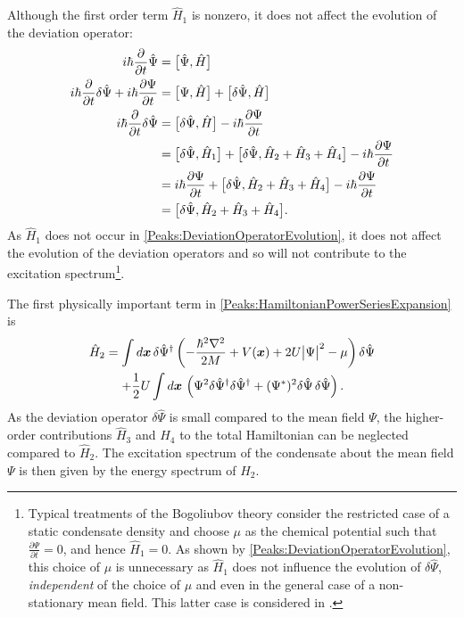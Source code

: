 Although the first order term $\hat{H}_1$ is nonzero, it does not affect the evolution of the deviation operator:
\begin{align}
    i \hbar \frac{\partial }{\partial t}\hat{\Psi} &= \comm{\hat{\Psi}, \hat{H}}\\
    i \hbar \frac{\partial }{\partial t}\delta{\hat{\Psi}} + i \hbar \frac{\partial \Psi}{\partial t} &= \comm{\Psi, \hat{H}} + \comm{\delta\hat{\Psi}, \hat{H}}\\
    i \hbar \frac{\partial }{\partial t}\delta \hat{\Psi} &= \comm{\delta \hat{\Psi}, \hat{H}} - i \hbar \frac{\partial  \Psi}{\partial t}\\
    &= \comm{\delta \hat{\Psi}, \hat{H}_1} + \comm{\delta \hat{\Psi}, \hat{H}_2 + \hat{H}_3 + \hat{H}_4} - i \hbar \frac{\partial\Psi }{\partial t}\\
    &= i \hbar \frac{\partial \Psi}{\partial t} + \comm{\delta \hat{\Psi}, \hat{H}_2 + \hat{H}_3 + \hat{H}_4} - i \hbar \frac{\partial \Psi}{\partial t}\\
    &= \comm{\delta \hat{\Psi}, \hat{H}_2 + \hat{H}_3 + \hat{H}_4}. \label{Peaks:DeviationOperatorEvolution}
\end{align}
As $\hat{H}_1$ does not occur in \eqref{Peaks:DeviationOperatorEvolution}, it does not affect the evolution of the deviation operators and so will not contribute to the excitation spectrum\footnote{Typical treatments of the Bogoliubov theory consider the restricted case of a static condensate density and choose $\mu$ as the chemical potential such that $\displaystyle \frac{\partial \Psi}{\partial t} = 0$, and hence $\hat{H}_1=0$. As shown by \eqref{Peaks:DeviationOperatorEvolution}, this choice of $\mu$ is unnecessary as $\hat{H}_1$ does not influence the evolution of $\delta\hat{\Psi}$, \emph{independent} of the choice of $\mu$ and even in the general case of a non-stationary mean field. This latter case is considered in .}.

The first physically important term in \eqref{Peaks:HamiltonianPowerSeriesExpansion} is
\begin{align}
    \begin{split}
        \hat{H}_2 &= \int d \vect{x}\, \delta \hat{\Psi}^\dagger \left(-\frac{\hbar^2 \nabla^2}{2 M} + V(\vect{x}) + 2 U\big|\Psi\big|^2 -\mu \right)\delta\hat{\Psi}\\
         &\relphantom{=} + \frac{1}{2} U\int d \vect{x}\, \left(\Psi^2 \delta \hat{\Psi}^\dagger\delta \hat{\Psi}^\dagger  +  (\Psi^*)^2 \delta \hat{\Psi} \,\delta \hat{\Psi}\right).
    \end{split}
    \label{Peaks:HamiltonianPowerSeriesQuadraticTerm}
\end{align}
As the deviation operator $\delta \hat{\Psi}$ is small compared to the mean field $\Psi$, the higher-order contributions $\hat{H}_3$ and $\hat{H}_4$ to the total Hamiltonian can be neglected compared to $\hat{H}_2$. The excitation spectrum of the condensate about the mean field $\Psi$ is then given by the energy spectrum of $\hat{H}_2$.

